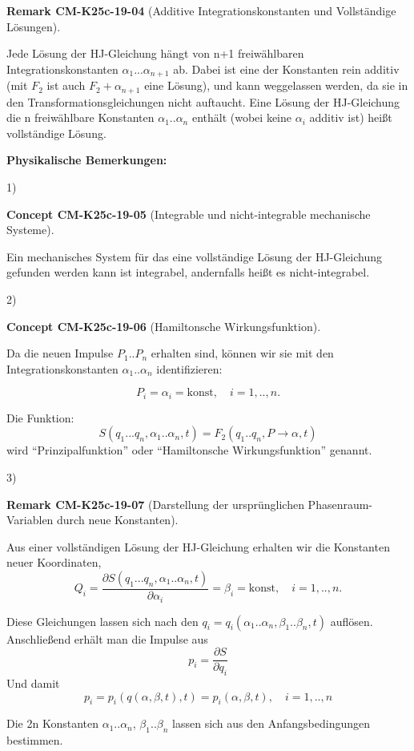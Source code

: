 \documentclass[10pt, letterpaper]{article}
\newcommand{\CustomHeading}[3]{%
  \par\medskip\noindent%
  \textbf{#1 #2} \textnormal{(#3)}.\enskip%
}
\newenvironment{REM}[2]{\begin{unitbox}\CustomHeading{Remark}{#1}{#2}}{\end{unitbox}}
\newenvironment{CONC}[2]{\begin{unitbox}\CustomHeading{Concept}{#1}{#2}}{\end{unitbox}}
\begin{document}
\begin{REM}{CM-K25c-19-04}{Additive Integrationskonstanten und Vollständige Lösungen}
Jede Lösung der HJ-Gleichung hängt von n+1 freiwählbaren Integrationskonstanten $\alpha_1...\alpha_{n+1}$ ab. Dabei ist eine der Konstanten rein additiv (mit $F_2$ ist auch $F_2 + \alpha_{n+1}$ eine Lösung), und kann weggelassen werden, da sie in den Transformationsgleichungen nicht auftaucht. Eine Lösung der HJ-Gleichung die n freiwählbare Konstanten $\alpha_1..\alpha_n$ enthält (wobei keine $\alpha_i$ additiv ist) heißt vollständige Lösung.
\end{REM}


\textbf{Physikalische Bemerkungen:}

1) 

\begin{CONC}{CM-K25c-19-05}{Integrable und nicht-integrable mechanische Systeme}
Ein mechanisches System für das eine vollständige Lösung der HJ-Gleichung gefunden werden kann ist integrabel, andernfalls heißt es nicht-integrabel.
\end{CONC}

2) 

\begin{CONC}{CM-K25c-19-06}{Hamiltonsche Wirkungsfunktion}
Da die neuen Impulse $P_1..P_n$ erhalten sind, können wir sie mit den Integrationskonstanten $\alpha_1..\alpha_n$ identifizieren:

\[P_i = \alpha_i = \text{konst}, \quad i=1,..,n.\]

Die Funktion:
\[S(q_1...q_n,\alpha_1..\alpha_n,t) = F_2(q_1..q_n,P\rightarrow\alpha,t)\]
wird ``Prinzipalfunktion'' oder ``Hamiltonsche Wirkungsfunktion'' genannt.
\end{CONC}

3) 



\begin{REM}{CM-K25c-19-07}{Darstellung der ursprünglichen Phasenraum-Variablen durch neue Konstanten}
Aus einer vollständigen Lösung der HJ-Gleichung erhalten wir die Konstanten neuer Koordinaten,
\[Q_i = \frac{\partial S(q_1...q_n,\alpha_1..\alpha_n,t)}{\partial \alpha_i} = \beta_i = \text{konst}, \quad i=1,..,n.\]

Diese Gleichungen lassen sich nach den $q_i=q_i(\alpha_1..\alpha_n,\beta_1..\beta_n,t)$ auflösen. Anschließend erhält man die Impulse aus
\[p_i = \frac{\partial S}{\partial q_i}\]
Und damit
\[p_i = p_i(q(\alpha,\beta,t),t) = p_i(\alpha,\beta,t), \quad i=1,..,n\]

Die 2n Konstanten $\alpha_1..\alpha_n$, $\beta_1..\beta_n$ lassen sich aus den Anfangsbedingungen bestimmen.
\end{REM}
\end{document}
